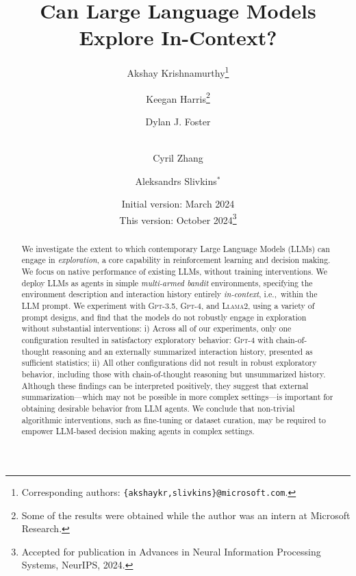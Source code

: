 \documentclass[11pt]{article}
\title{
Can Large Language Models Explore In-Context?}
\author[1]{Akshay Krishnamurthy\footnote{Corresponding authors: \texttt{\{akshaykr,slivkins\}@microsoft.com}.}}
\author[2]{Keegan Harris\footnote{Some of the results were obtained while the author was an intern at Microsoft Research.}}
\author[1]{Dylan J. Foster}
\author[1]{\\Cyril Zhang}
\author[1]{Aleksandrs Slivkins$^*$}
\affil[1]{\normalsize Microsoft Research}
\affil[2]{\normalsize Carnegie Mellon University}
\date{\vspace*{-3mm}\normalsize Initial version: March 2024\\This version: October 2024\footnote{Accepted for publication in Advances in Neural Information Processing Systems, NeurIPS, 2024.}\vspace*{-3mm}
}
\newcommand{\gptfour}{\textsc{Gpt-4}\xspace}
\newcommand{\gptthree}{\textsc{Gpt-3.5}\xspace}
\newcommand{\llama}{\textsc{Llama2}\xspace}
\newcommand{\ie}{{i.e.,~\xspace}}
\begin{document}
\maketitle
\begin{abstract}
We investigate the extent to which contemporary Large Language Models (LLMs) can engage in \emph{exploration}, a core capability in reinforcement learning and decision making. We focus on native performance of existing LLMs, without training interventions. We deploy LLMs as agents in simple \emph{multi-armed bandit} environments, specifying the environment description and interaction history entirely \emph{in-context}, \ie within the LLM prompt. We experiment with \gptthree, \gptfour, and \llama, using a variety of prompt designs, and find that the models do not robustly engage in exploration without substantial interventions: i) Across all of our experiments, only one configuration resulted in satisfactory exploratory behavior: \gptfour with chain-of-thought reasoning and an externally summarized interaction history, presented as sufficient statistics; ii) All other configurations did not result in robust exploratory behavior, including those with chain-of-thought reasoning but unsummarized history.
Although these findings can be interpreted positively, they suggest that external summarization---which may not be possible in more complex settings---is important for obtaining desirable behavior from LLM agents.
We conclude that non-trivial algorithmic interventions, such as fine-tuning or dataset curation, may be required to empower LLM-based decision making agents in complex settings.
\end{abstract}
\end{document}
